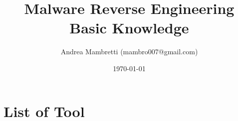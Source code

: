 \documentclass[]{beamer}
\title{Malware Reverse Engineering Basic Knowledge}    %
\author{Andrea Mambretti (mambro007@gmail.com)}        %
\institute{Politecnico di Milano}      %
\date{\today}                    %
\begin{document}
\begin{frame}
  \titlepage
\end{frame}

\section[Outline]{}

\begin{frame}
  \tableofcontents
\end{frame}
\section{List of Tool}
\end{document}
